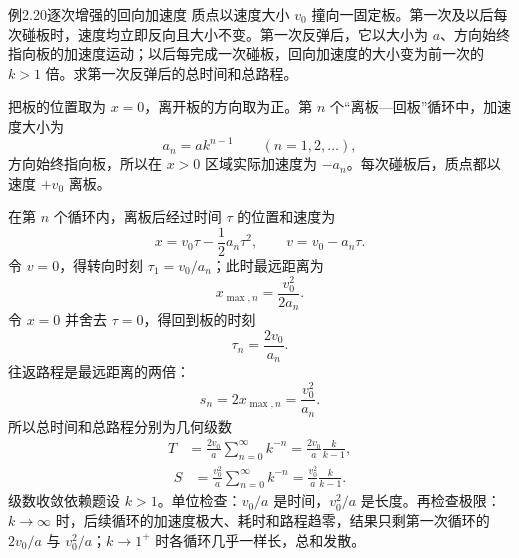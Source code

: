 \begin{origexamplebox}{例2.20\quad 逐次增强的回向加速度}
质点以速度大小 $v_0$ 撞向一固定板。第一次及以后每次碰板时，速度均立即反向且大小不变。第一次反弹后，它以大小为 $a$、方向始终指向板的加速度运动；以后每完成一次碰板，回向加速度的大小变为前一次的 $k>1$ 倍。求第一次反弹后的总时间和总路程。
\end{origexamplebox}
\begin{xesolution}
把板的位置取为 $x=0$，离开板的方向取为正。第 $n$ 个“离板—回板”循环中，加速度大小为
\[
a_n=ak^{n-1}\qquad(n=1,2,\ldots),
\]
方向始终指向板，所以在 $x>0$ 区域实际加速度为 $-a_n$。每次碰板后，质点都以速度 $+v_0$ 离板。

在第 $n$ 个循环内，离板后经过时间 $\tau$ 的位置和速度为
\[
x=v_0\tau-\frac12a_n\tau^2,
\qquad
v=v_0-a_n\tau.
\]
令 $v=0$，得转向时刻 $\tau_1=v_0/a_n$；此时最远距离为
\[
x_{\max,n}=\frac{v_0^2}{2a_n}.
\]
令 $x=0$ 并舍去 $\tau=0$，得回到板的时刻
\[
\tau_n=\frac{2v_0}{a_n}.
\]
往返路程是最远距离的两倍：
\[
s_n=2x_{\max,n}=\frac{v_0^2}{a_n}.
\]
所以总时间和总路程分别为几何级数
\[
\begin{aligned}
T&=\frac{2v_0}{a}\sum_{n=0}^{\infty}k^{-n}
=\boxed{\frac{2v_0}{a}\frac{k}{k-1}},
\end{aligned}
\]
\[
\begin{aligned}
S&=\frac{v_0^2}{a}\sum_{n=0}^{\infty}k^{-n}
=\boxed{\frac{v_0^2}{a}\frac{k}{k-1}}.
\end{aligned}
\]
级数收敛依赖题设 $k>1$。单位检查：$v_0/a$ 是时间，$v_0^2/a$ 是长度。再检查极限：$k\to\infty$ 时，后续循环的加速度极大、耗时和路程趋零，结果只剩第一次循环的 $2v_0/a$ 与 $v_0^2/a$；$k\to1^+$ 时各循环几乎一样长，总和发散。
\end{xesolution}

